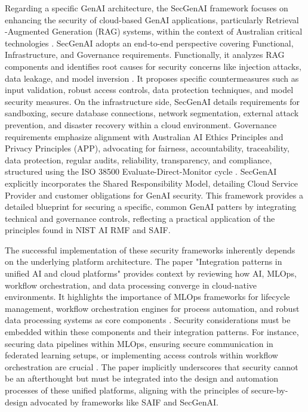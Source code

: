 Regarding a specific GenAI architecture, the SecGenAI framework focuses on enhancing the security of cloud-based GenAI applications, particularly Retrieval\-\\-Augmented Generation (RAG) systems, within the context of Australian critical technologies \cite{haryanto_secgenai_2024}. SecGenAI adopts an end-to-end perspective covering Functional, Infrastructure, and Governance requirements. Functionally, it analyzes RAG components and identifies root causes for security concerns like injection attacks, data leakage, and model inversion \cite{haryanto_secgenai_2024}. It proposes specific countermeasures such as input validation, robust access controls, data protection techniques, and model security measures\cite{haryanto_secgenai_2024}. On the infrastructure side, SecGenAI details requirements for sandboxing, secure database connections, network segmentation, external attack prevention, and disaster recovery within a cloud environment\cite{haryanto_secgenai_2024}. Governance requirements emphasize alignment with Australian AI Ethics Principles and Privacy Principles (APP), advocating for fairness, accountability, traceability, data protection, regular audits, reliability, transparency, and compliance, structured using the ISO 38500 Evaluate-Direct-Monitor cycle \cite{noauthor_isoiec_nodate}. SecGenAI explicitly incorporates the Shared Responsibility Model, detailing Cloud Service Provider and customer obligations for GenAI security\cite{haryanto_secgenai_2024}. This framework provides a detailed blueprint for securing a specific, common GenAI patters by integrating technical and governance controls, reflecting a practical application of the principles found in NIST AI RMF and SAIF.

The successful implementation of these security frameworks inherently depends on the underlying platform architecture. The paper "Integration patterns in unified AI and cloud platforms" provides context by reviewing how AI, MLOps, workflow orchestration, and data processing converge in cloud-native environments\cite{sushil_prabhu_prabhakaran_integration_2024}. It highlights the importance of MLOps frameworks for lifecycle management, workflow orchestration engines for process automation, and robust data processing systems as core components \cite{sushil_prabhu_prabhakaran_integration_2024}. Security considerations must be embedded within these components and their integration patterns. For instance, securing data pipelines within MLOps, ensuring secure communication in federated learning setups, or implementing access controls within workflow orchestration are crucial \cite{sushil_prabhu_prabhakaran_integration_2024, hansen_introducing_2023, haryanto_secgenai_2024}. The paper implicitly underscores that security cannot be an afterthought but must be integrated into the design and automation processes of these unified platforms, aligning with the principles of secure-by-design advocated by frameworks like SAIF and SecGenAI.

